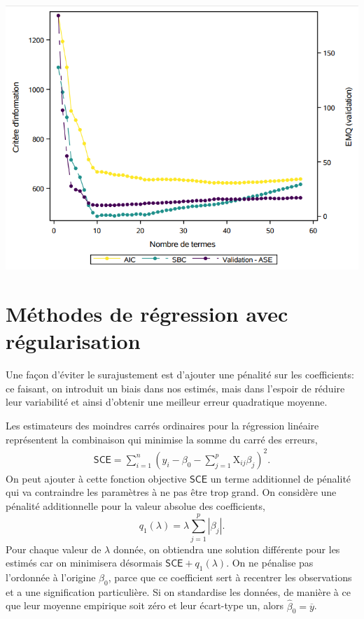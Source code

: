 \documentclass[
  11pt,
  letterpaper,
]{book}
\theoremstyle{definition}
\theoremstyle{definition}
\theoremstyle{definition}
\theoremstyle{definition}
\theoremstyle{remark}
\begin{document}
\begin{center}\includegraphics[width=0.85\linewidth]{figures/02-select-e12} \end{center}

\hypertarget{muxe9thodes-de-ruxe9gression-avec-ruxe9gularisation}{%
\section{Méthodes de régression avec régularisation}\label{muxe9thodes-de-ruxe9gression-avec-ruxe9gularisation}}

Une façon d'éviter le surajustement est d'ajouter une pénalité sur les coefficients: ce faisant, on introduit un biais dans nos estimés, mais dans l'espoir de réduire leur variabilité et ainsi d'obtenir une meilleur erreur quadratique moyenne.

Les estimateurs des moindres carrés ordinaires pour la régression linéaire représentent la combinaison qui minimise la somme du carré des erreurs,
\begin{align*}
\mathsf{SCE} = \sum_{i=1}^n \left(y_i - \beta_0 - \sum_{j=1}^p\mathrm{X}_{ij}\beta_{j}\right)^2.
\end{align*}
On peut ajouter à cette fonction objective \(\mathsf{SCE}\) un terme additionnel de pénalité qui va contraindre les paramètres à ne pas être trop grand. On considère une pénalité additionnelle pour la valeur absolue des coefficients, \[
q_1(\lambda) = \lambda \sum_{j=1}^p |\beta_j|.
\]
Pour chaque valeur de \(\lambda\) donnée, on obtiendra une solution différente pour les estimés car on minimisera désormais \(\mathsf{SCE} + q_1(\lambda)\). On ne pénalise pas l'ordonnée à l'origine \(\beta_0\), parce que ce coefficient sert à recentrer les observations et a une signification particulière. Si on standardise les données, de manière à ce que leur moyenne empirique soit zéro et leur écart-type un, alors \(\widehat{\beta}_0 = \overline{y}\).
\end{document}
